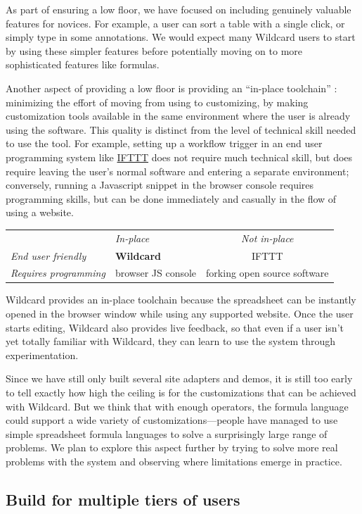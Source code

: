 \documentclass[english,submission]{programming}
\begin{document}
As part of ensuring a low floor, we have focused on including genuinely
valuable features for novices. For example, a user can sort a table with
a single click, or simply type in some annotations. We would expect many
Wildcard users to start by using these simpler features before
potentially moving on to more sophisticated features like formulas.

Another aspect of providing a low floor is providing an ``in-place
toolchain'' \autocite{inkandswitch2019}: minimizing the effort of moving
from using to customizing, by making customization tools available in
the same environment where the user is already using the software. This
quality is distinct from the level of technical skill needed to use the
tool. For example, setting up a workflow trigger in an end user
programming system like \href{https://ifttt.com/}{IFTTT} does not
require much technical skill, but does require leaving the user's normal
software and entering a separate environment; conversely, running a
Javascript snippet in the browser console requires programming skills,
but can be done immediately and casually in the flow of using a website.

\begin{longtable}[]{@{}llc@{}}
\toprule
\endhead
& \emph{In-place} & \emph{Not in-place}\tabularnewline
\emph{End user friendly} & \textbf{Wildcard} & IFTTT\tabularnewline
\emph{Requires programming} & browser JS console & forking open source
software\tabularnewline
\bottomrule
\end{longtable}

Wildcard provides an in-place toolchain because the spreadsheet can be
instantly opened in the browser window while using any supported
website. Once the user starts editing, Wildcard also provides live
feedback, so that even if a user isn't yet totally familiar with
Wildcard, they can learn to use the system through experimentation.

Since we have still only built several site adapters and demos, it is
still too early to tell exactly how high the ceiling is for the
customizations that can be achieved with Wildcard. But we think that
with enough operators, the formula language could support a wide variety
of customizations---people have managed to use simple spreadsheet
formula languages to solve a surprisingly large range of problems. We
plan to explore this aspect further by trying to solve more real
problems with the system and observing where limitations emerge in
practice.

\hypertarget{build-for-multiple-tiers-of-users}{%
\subsection{Build for multiple tiers of
users}\label{build-for-multiple-tiers-of-users}}
\end{document}
